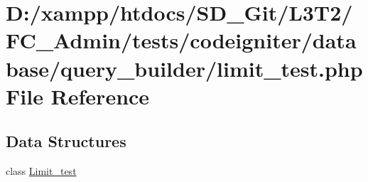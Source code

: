 \hypertarget{_admin_2tests_2codeigniter_2database_2query__builder_2limit__test_8php}{}\section{D\+:/xampp/htdocs/\+S\+D\+\_\+\+Git/\+L3\+T2/\+F\+C\+\_\+\+Admin/tests/codeigniter/database/query\+\_\+builder/limit\+\_\+test.php File Reference}
\label{_admin_2tests_2codeigniter_2database_2query__builder_2limit__test_8php}
\subsection*{Data Structures}
\begin{DoxyCompactItemize}
\item 
class \hyperlink{class_limit__test}{Limit\+\_\+test}
\end{DoxyCompactItemize}

